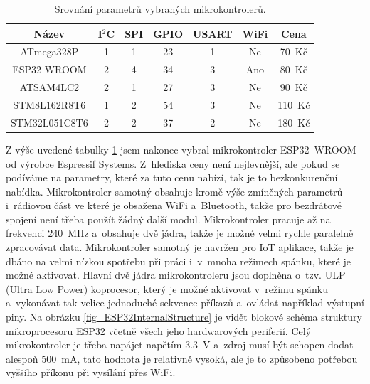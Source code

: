 \begin{table}[h]
    \caption{Srovnání parametrů vybraných mikrokontrolerů.}
    \centering
    \begin{tabular}{c|cccccc}
        \textbf{Název}                         & \textbf{I$^2$C} & \textbf{SPI} & \textbf{GPIO} & \textbf{USART} & \textbf{WiFi} & \textbf{Cena} \\ \hline
        ATmega328P \cite{dat_ATmega328p}       & 1 & 1 & 23 & 1 & Ne  & 70~Kč \\
        ESP32 WROOM \cite{dat_ESP32-WROOM}     & 2 & 4 & 34 & 3 & Ano & 80~Kč \\
        ATSAM4LC2 \cite{dat_ATSAM4LC2}         & 2 & 1 & 27 & 3 & Ne  & 90~Kč \\
        STM8L162R8T6 \cite{dat_STM8L162R8T6}   & 1 & 2 & 54 & 3 & Ne  & 110~Kč \\
        STM32L051C8T6 \cite{dat_STM32L051C8T6} & 2 & 2 & 37 & 2 & Ne  & 180~Kč
        
    \end{tabular}
    \label{tab_MCU}
\end{table}

Z výše uvedené tabulky \ref{tab_MCU} jsem nakonec vybral mikrokontroler ESP32~WROOM od výrobce Espressif Systems. Z~hlediska ceny není nejlevnější, ale pokud se podíváme na parametry, které za tuto cenu nabízí, tak je to bezkonkurenční nabídka. Mikrokontroler samotný obsahuje kromě výše zmíněných parametrů i~rádiovou část ve které je obsažena WiFi a~Bluetooth, takže pro bezdrátové spojení není třeba použít žádný další modul. Mikrokontroler pracuje až na frekvenci \SI{240}{\mega\hertz} a~obsahuje dvě jádra, takže je možné velmi rychle paralelně zpracovávat data. Mikrokontroler samotný je navržen pro IoT aplikace, takže je dbáno na velmi nízkou spotřebu při práci i~v~mnoha režimech spánku, které je možné aktivovat. Hlavní dvě jádra mikrokontroleru jsou doplněna o~tzv. ULP (Ultra Low Power) koprocesor, který je možné aktivovat v~režimu spánku a~vykonávat tak velice jednoduché sekvence příkazů a~ovládat například výstupní piny. Na obrázku \ref{fig_ESP32InternalStructure} je vidět blokové schéma struktury mikroprocesoru ESP32 včetně všech jeho hardwarových periferií. Celý mikrokontroler je třeba napájet napětím \SI{3,3}{\volt} a~zdroj musí být schopen dodat alespoň \SI{500}{\milli\ampere}, tato hodnota je relativně vysoká, ale je to způsobeno potřebou vyššího příkonu při vysílání přes WiFi.

